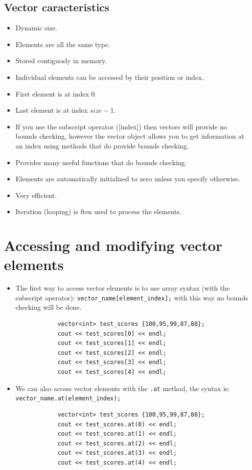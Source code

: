\subsection{Vector caracteristics}
\begin{itemize}
    \item Dynamic size. 
    \item Elements are all the same type.
    \item Stored contiguosly in memory.
    \item Individual elements can be accessed by their position or index.
    \item First element is at index 0.
    \item Last element is at index $size-1$.
    \item If you use the subscript operator ([index]) then vectors will provide no bounds checking, however the vector object allows you to get information at an index using methods that do provide bounds checking.
    \item Provides many useful functions that do bounds checking.
    \item Elements are automatically initialized to zero unless you specify otherwise.
    \item Very efficient.
    \item Iteration (looping) is ften used to process the elements.
\end{itemize}


\section{Accessing and modifying vector elements}
\begin{itemize}
    \item The first way to access vector elements is to use array syntax (with the subscript operator): \verb|vector_name[element_index];| with this way no bounds checking will be done.
        \begin{verbatim}
            vector<int> test_scores {100,95,99,87,88};
            cout << test_scores[0] << endl;
            cout << test_scores[1] << endl;
            cout << test_scores[2] << endl;
            cout << test_scores[3] << endl;
            cout << test_scores[4] << endl;
        \end{verbatim}
    \item We can also access vector elements with the \verb|.at| method, the syntax is: \verb|vector_name.at(element_index);|
        \begin{verbatim}
            vector<int> test_scores {100,95,99,87,88};
            cout << test_scores.at(0) << endl;
            cout << test_scores.at(1) << endl;
            cout << test_scores.at(2) << endl;
            cout << test_scores.at(3) << endl;
            cout << test_scores.at(4) << endl;
        \end{verbatim}
\end{itemize}

